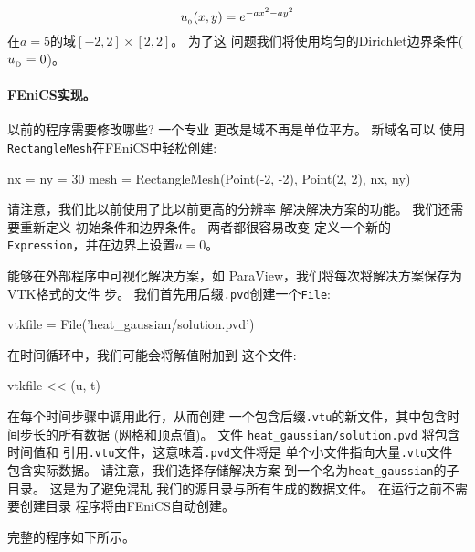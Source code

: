 \[ \uI(x,y)= e^{-ax^2 - ay^2}\]
在$a = 5$的域$[-2,2]\times [2,2]$。 为了这
问题我们将使用均匀的Dirichlet边界条件($\ub = 0$)。

\paragraph{FEniCS实现。}
以前的程序需要修改哪些? 一个专业
更改是域不再是单位平方。 新域名可以
使用\texttt{RectangleMesh}在FEniCS中轻松创建:

\begin{python}
nx = ny = 30
mesh = RectangleMesh(Point(-2, -2), Point(2, 2), nx, ny)
\end{python}
请注意，我们比以前使用了比以前更高的分辨率
解决解决方案的功能。 我们还需要重新定义
初始条件和边界条件。 两者都很容易改变
定义一个新的\texttt{Expression}，并在边界上设置$u = 0$。

能够在外部程序中可视化解决方案，如
ParaView，我们将每次将解决方案保存为VTK格式的文件
步。 我们首先用后缀\texttt{.pvd}创建一个\texttt{File}:

\begin{python}
vtkfile = File('heat_gaussian/solution.pvd')
\end{python}
在时间循环中，我们可能会将解值附加到
这个文件:

\begin{python}
vtkfile << (u, t)
\end{python}
在每个时间步骤中调用此行，从而创建
一个包含后缀\texttt{.vtu}的新文件，其中包含时间步长的所有数据
(网格和顶点值)。 文件
\verb!heat_gaussian/solution.pvd! 将包含时间值和
引用\texttt{.vtu}文件，这意味着\texttt{.pvd}文件将是
单个小文件指向大量\texttt{.vtu}文件
包含实际数据。 请注意，我们选择存储解决方案
到一个名为\verb!heat_gaussian!的子目录。 这是为了避免混乱
我们的源目录与所有生成的数据文件。
在运行之前不需要创建目录
程序将由FEniCS自动创建。


完整的程序如下所示。

